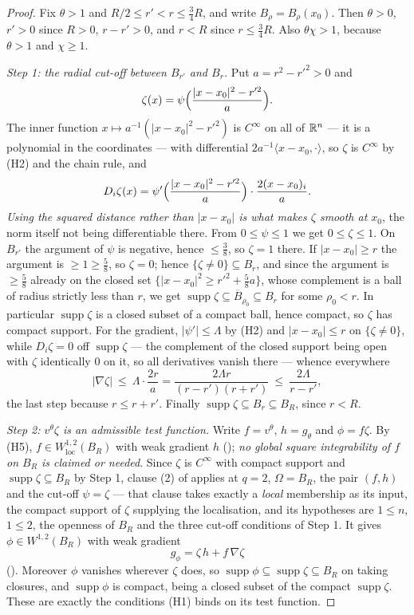 \begin{proof}
Fix $\theta>1$ and $R/2\le r'<r\le\frac34R$, and write $B_\rho=B_\rho(x_0)$.
Then $\theta>0$, $r'>0$ since $R>0$, $r-r'>0$, and $r<R$ since
$r\le\frac34R$.  Also $\theta\chi>1$, because $\theta>1$ and $\chi\ge1$.

\emph{Step 1: the radial cut-off between $B_{r'}$ and $B_r$.}  Put
$a=r^2-r'^2>0$ and
\[
\zeta(x)=\psi\Bigl(\frac{|x-x_0|^2-r'^2}{a}\Bigr).
\]
The inner function $x\mapsto a^{-1}(|x-x_0|^2-r'^2)$ is $C^\infty$ on all of
$\mathbb{R}^n$ --- it is a polynomial in the coordinates --- with differential
$2a^{-1}\langle x-x_0,\cdot\rangle$, so $\zeta$ is $C^\infty$ by (H2) and the
chain rule, and
\[
D_i\zeta(x)=\psi'\Bigl(\frac{|x-x_0|^2-r'^2}{a}\Bigr)\cdot
\frac{2(x-x_0)_i}{a} .
\]
\emph{Using the squared distance rather than $|x-x_0|$ is what makes $\zeta$
smooth at $x_0$}, the norm itself not being differentiable there.  From
$0\le\psi\le1$ we get $0\le\zeta\le1$.  On $B_{r'}$ the argument of $\psi$ is
negative, hence $\le\tfrac38$, so $\zeta=1$ there.  If
$|x-x_0|\ge r$ the argument is $\ge1\ge\tfrac58$, so $\zeta=0$; hence
$\{\zeta\ne0\}\subseteq B_r$, and since the argument is $\ge\tfrac58$ already on
the closed set $\{|x-x_0|^2\ge r'^2+\tfrac58a\}$, whose complement is a ball of
radius strictly less than $r$, we get
$\operatorname{supp}\zeta\subseteq\overline B_{\rho_0}\subseteq B_r$ for some
$\rho_0<r$.  In particular $\operatorname{supp}\zeta$ is a closed subset of a
compact ball, hence compact, so $\zeta$ has compact support.  For the gradient,
$|\psi'|\le\Lambda$ by (H2) and $|x-x_0|\le r$ on $\{\zeta\ne0\}$, while
$D_i\zeta=0$ off $\operatorname{supp}\zeta$ --- the complement of the closed
support being open with $\zeta$ identically $0$ on it, so all derivatives vanish
there --- whence everywhere
\[
|\nabla\zeta|\ \le\ \Lambda\cdot\frac{2r}{a}
=\frac{2\Lambda r}{(r-r')(r+r')}\ \le\ \frac{2\Lambda}{r-r'} ,
\tag{1}
\]
the last step because $r\le r+r'$.  Finally
$\operatorname{supp}\zeta\subseteq B_r\subseteq B_R$, since $r<R$.

\emph{Step 2: $v^\theta\zeta$ is an admissible test function.}  Write
$f=v^\theta$, $h=g_\theta$ and $\phi=f\zeta$.  By (H5),
$f\in W^{1,2}_{\mathrm{loc}}(B_R)$ with weak gradient $h$
(); \emph{no global square integrability of $f$ on $B_R$ is
claimed or needed}.  Since $\zeta$ is $C^\infty$ with compact support and
$\operatorname{supp}\zeta\subseteq B_R$ by Step 1, clause (2) of
 applies at $q=2$, $\Omega=B_R$, the pair
$(f,h)$ and the cut-off $\psi=\zeta$ --- that clause takes exactly a
\emph{local} membership as its input, the compact support of $\zeta$ supplying
the localisation, and its hypotheses are $1\le n$, $1\le2$, the openness of
$B_R$ and the three cut-off conditions of Step 1.  It gives
$\phi\in W^{1,2}(B_R)$ with weak gradient
\[
g_\phi=\zeta\,h+f\,\nabla\zeta
\]
().  Moreover $\phi$ vanishes wherever $\zeta$ does, so
$\operatorname{supp}\phi\subseteq\operatorname{supp}\zeta\subseteq B_R$ on
taking closures, and $\operatorname{supp}\phi$ is compact, being a closed
subset of the compact $\operatorname{supp}\zeta$.  These are exactly the
conditions (H1) binds on its test function.


\end{proof}
